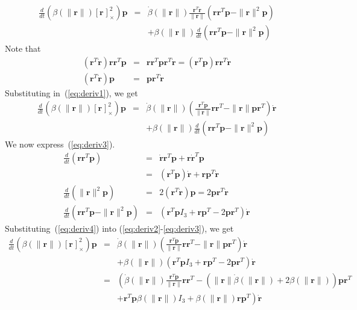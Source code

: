 \documentclass {article}
\newcommand\rot{\mathbf{r}}
\newcommand\rcross[1]{[\rot_{#1}]_{\times}}
\newcommand\normr{\|\rot\|}
\begin{document}
\begin{eqnarray}\label{eq:deriv1}
\frac{d}{dt}\left(\beta (\normr)\rcross{}^2 \right)\mathbf{p} &=&
\dot{\beta} (\normr) \frac{\rot^T\dot{\rot}}{\normr}(\rot\rot^T\mathbf{p} - \normr^2\mathbf{p})\\
&& +\beta (\normr)\frac{d}{dt}(\rot\rot^T\mathbf{p} - \normr^2\mathbf{p})
\end{eqnarray}
Note that
\begin{eqnarray*}
(\rot^T\dot{\rot})\rot\rot^T\mathbf{p} &=& \rot\rot^T\mathbf{p}\rot^T\dot{\rot} = (\rot^T\mathbf{p})\rot\rot^T\dot{\rot}\\
(\rot^T\dot{\rot})\mathbf{p} &=& \mathbf{p}\rot^T\dot{\rot}
\end{eqnarray*}
Substituting in~(\ref{eq:deriv1}), we get
\begin{eqnarray}\label{eq:deriv2}
\frac{d}{dt}\left(\beta (\normr)\rcross{}^2 \right)\mathbf{p} &=&
\dot{\beta} (\normr) (\frac{\rot^T\mathbf{p}}{\normr}\rot\rot^T
-\normr \mathbf{p}\rot^T)\dot{\rot}\\
\label{eq:deriv3}
&& +\beta (\normr)\frac{d}{dt}(\rot\rot^T\mathbf{p} - \normr^2\mathbf{p})
\end{eqnarray}
We now express~(\ref{eq:deriv3}).
\begin{eqnarray}
  \frac{d}{dt}(\rot\rot^T\mathbf{p}) &=& \dot{\rot}\rot^T\mathbf{p} + \rot\dot{\rot}^T\mathbf{p}\\
&=& (\rot^T\mathbf{p})\dot{\rot} + \rot\mathbf{p}^T\dot{\rot}\\
  \frac{d}{dt}(\normr^2\mathbf{p}) &=& 2(\rot^T\dot{\rot})\mathbf{p}
= 2\mathbf{p}\rot^T\dot{\rot}\\
\label{eq:deriv4}
\frac{d}{dt}(\rot\rot^T\mathbf{p} - \normr^2\mathbf{p}) &=&
(\rot^T\mathbf{p}I_3 + \rot\mathbf{p}^T - 2\mathbf{p}\rot^T)\dot{\rot}
\end{eqnarray}
Substituting~(\ref{eq:deriv4}) into (\ref{eq:deriv2}-\ref{eq:deriv3}), we get
\begin{eqnarray}\label{eq:deriv5}
\frac{d}{dt}\left(\beta (\normr)\rcross{}^2 \right)\mathbf{p} &=&
\dot{\beta} (\normr) (\frac{\rot^T\mathbf{p}}{\normr}\rot\rot^T
-\normr \mathbf{p}\rot^T)\dot{\rot}\\
\label{eq:deriv6}
&& +\beta (\normr)(\rot^T\mathbf{p}I_3 + \rot\mathbf{p}^T - 2\mathbf{p}\rot^T)\dot{\rot}\\
\label{eq:deriv7}
&=&\left(\dot{\beta} (\normr) \frac{\rot^T\mathbf{p}}{\normr}\rot\rot^T
- (\normr\dot{\beta} (\normr) + 2 \beta(\normr)) \mathbf{p}\rot^T\right.\\
\label{eq:deriv8}
&&\left. + \rot^T\mathbf{p}\beta (\normr)I_3 + \beta (\normr)\rot\mathbf{p}^T\right)\dot{\rot}
\end{eqnarray}
\end{document}
